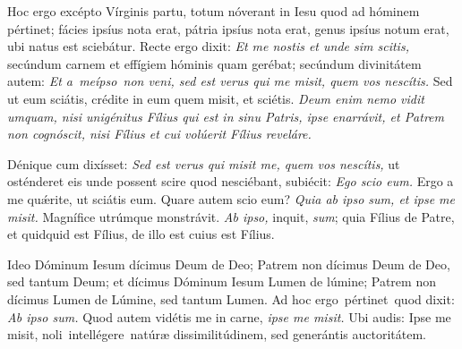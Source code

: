 {\noindent Hoc ergo excépto Vírginis partu, totum nóverant in Iesu quod ad hóminem pértinet; fácies ipsíus nota erat, pátria ipsíus nota erat, genus ipsíus notum erat, ubi natus est sciebátur. Recte ergo dixit: \textit{Et me nostis et unde sim scitis,} secúndum carnem et effígiem hóminis quam gerébat; secúndum divinitátem autem: \textit{Et a meípso non veni, sed est verus qui me misit, quem vos nescítis.} Sed ut eum sciátis, crédite in eum quem misit, et sciétis. \textit{Deum enim nemo vidit umquam, nisi unigénitus Fílius qui est in sinu Patris, ipse enarrávit, et Patrem non cognóscit, nisi Fílius et cui volúerit Fílius reveláre.}

\noindent Dénique cum dixísset: \textit{Sed est verus qui misit me, quem vos nescítis,} ut osténderet eis unde possent scire quod nesciébant, subiécit: \textit{Ego scio eum.} Ergo a me quǽrite, ut sciátis eum. Quare autem scio eum? \textit{Quia ab ipso sum, et ipse me misit.} Magnífice utrúmque monstrávit. \textit{Ab ipso,} inquit, \textit{sum}; quia Fílius de Patre, et quidquid est Fílius, de illo est cuius est Fílius.
	
\noindent Ideo Dóminum Iesum dícimus Deum de Deo; Patrem non dícimus Deum de Deo, sed tantum Deum; et dícimus Dóminum Iesum Lumen de lúmine; Patrem non dícimus Lumen de Lúmine, sed tantum Lumen. Ad hoc ergo pértinet quod dixit: \textit{Ab ipso sum.} Quod autem vidétis me in carne, \textit{ipse me misit.} Ubi audis: Ipse me misit, noli intellégere natúræ dissimilitúdinem, sed generántis auctoritátem.

\vfill
\pagebreak

 

\vspace{-5mm}


\vfill
\pagebreak
}
\newcommand{\benedictus}{\pars{Canticum Zachariæ.}  \scriptura{Mt. 13, 54-55}

\vspace{-4mm}

\antiphona{VIII G}{temporalia/ant-etdicebantunde.gtex}

\vspace{-2mm}

\scriptura{Lc. 1, 68-79}

\vspace{-2mm}

\cantusSineNeumas
\initiumpsalmi{temporalia/benedictus-initium-viiisoll-G-auto.gtex}


 \Abardot{}}


